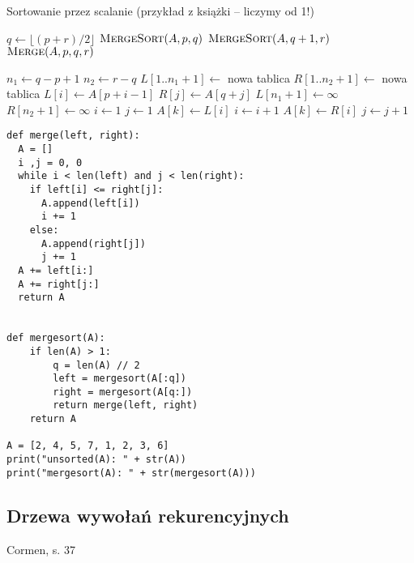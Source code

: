 \documentclass[10pt, oneside]{article}
\theoremstyle{remark}
\begin{document}
\begin{algorithm}
    \caption{Sortowanie przez scalanie (przykład z książki -- liczymy od 1!)}
    \label{merge_sort}
    \begin{algorithmic}[1] %
            		\State $q \gets \lfloor (p + r)/2 \rfloor$
            		\State $\Call{MergeSort}{A, p, q}$
            		\State $\Call{MergeSort}{A, q+1, r}$
            		\State $\Call{Merge}{A, p, q, r}$
            	\EndIf
        \EndFunction
        
            	\State $n_1 \gets q -p + 1$
            	\State $n_2 \gets r-q$
            	\State $L[1..n_{1}+1] \gets$ nowa tablica
            	\State $R[1..n_{2}+1] \gets$ nowa tablica
            		\State $L[i] \gets A[p+i-1]$ 
            	\EndFor
            		\State $R[j] \gets A[q+j]$ 
            	\EndFor
            	\State $L[n_1 + 1] \gets \infty$
            	\State $R[n_2 + 1] \gets \infty$
            	\State $i \gets 1$
            	\State $j \gets 1$
            			\State $A[k] \gets L[i]$
            			\State $i \gets i + 1$
            		\Else{}
            			\State $A[k] \gets R[i]$
            			\State $j \gets j + 1$
            		\EndIf
            	\EndFor
        \EndFunction
    \end{algorithmic}
\end{algorithm}

\begin{verbatim}
def merge(left, right):
  A = []
  i ,j = 0, 0
  while i < len(left) and j < len(right):
    if left[i] <= right[j]:
      A.append(left[i])
      i += 1
    else:
      A.append(right[j])
      j += 1
  A += left[i:]
  A += right[j:]
  return A


def mergesort(A):
	if len(A) > 1:
		q = len(A) // 2
		left = mergesort(A[:q])
		right = mergesort(A[q:])
		return merge(left, right)
	return A
	
A = [2, 4, 5, 7, 1, 2, 3, 6]
print("unsorted(A): " + str(A))
print("mergesort(A): " + str(mergesort(A)))
\end{verbatim}

\subsection{Drzewa wywołań rekurencyjnych}
Cormen, s. 37
\end{document}
